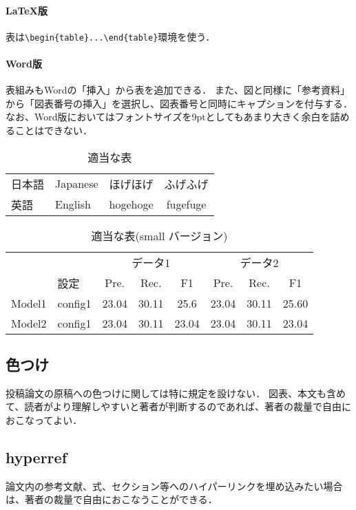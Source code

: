 \documentclass[
  platex, dvipdfmx,  %
]{nlp2021}
\begin{document}
\paragraph{LaTeX版}
表は\verb|\begin{table}...\end{table}|環境を使う．

\paragraph{Word版}
表組みもWordの「挿入」から表を追加できる．
また、図と同様に「参考資料」から「図表番号の挿入」を選択し、図表番号と同時にキャプションを付与する．
なお、Word版においてはフォントサイズを9ptとしてもあまり大きく余白を詰めることはできない．

\begin{table}[t]
\centering
\caption{適当な表}
\label{tab:sample1}
\begin{tabular}{llcc}
\hline
日本語 & Japanese & ほげほげ & ふげふげ\\
英語 & English & hogehoge & fugefuge\\
\hline
\end{tabular}
\end{table}
%
\begin{table}[t]
\centering
\small
\tabcolsep 3pt
\caption{適当な表(small バージョン)}
\label{tab:sample2}
\begin{tabular}{llcccccc}
\hline
\      &      &\multicolumn{3}{c}{データ1}&\multicolumn{3}{c}{データ2}\\
\      & 設定 & Pre. & Rec. &F1 & Pre. & Rec. &F1\\
\hline
Model1 & config1 & 23.04 & 30.11 &  25.6 & 23.04 & 30.11 &  25.60\\
Model2 & config1 & 23.04 & 30.11 & 23.04 & 23.04 & 30.11 & 23.04 \\
\hline
\end{tabular}
\end{table}

\subsection{色つけ}
投稿論文の原稿への色つけに関しては特に規定を設けない．
図表、本文も含めて、読者がより理解しやすいと著者が判断するのであれば、著者の裁量で自由におこなってよい．

\subsection{hyperref}
論文内の参考文献、式、セクション等へのハイパーリンクを埋め込みたい場合は、著者の裁量で自由におこなうことができる．
\end{document}
